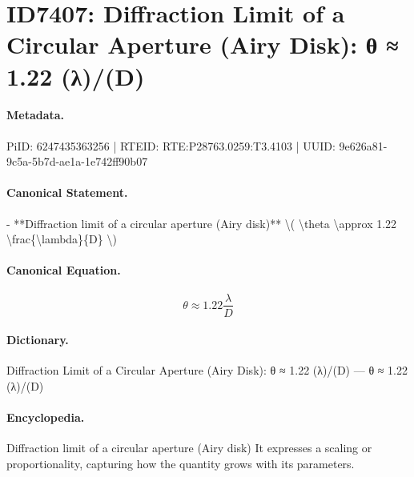 \section*{ID7407: Diffraction Limit of a Circular Aperture (Airy Disk): θ ≈ 1.22 (λ)/(D)}
\paragraph{Metadata.}
PiID: 6247435363256 | RTEID: RTE:P28763.0259:T3.4103 | UUID: 9e626a81-9c5a-5b7d-ae1a-1e742ff90b07

\paragraph{Canonical Statement.}
- **Diffraction limit of a circular aperture (Airy disk)** \textbackslash{}( \textbackslash{}theta \textbackslash{}approx 1.22 \textbackslash{}frac\{\textbackslash{}lambda\}\{D\} \textbackslash{})

\paragraph{Canonical Equation.}
\[
\theta \approx 1.22 \frac{\lambda}{D}
\]

\paragraph{Dictionary.}
Diffraction Limit of a Circular Aperture (Airy Disk): θ ≈ 1.22 (λ)/(D) — θ ≈ 1.22 (λ)/(D)

\paragraph{Encyclopedia.}
Diffraction limit of a circular aperture (Airy disk) It expresses a scaling or proportionality, capturing how the quantity grows with its parameters.
